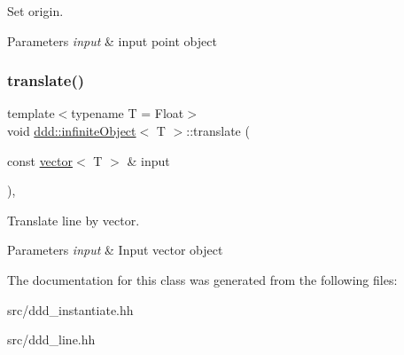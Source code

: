 Set origin. 


\begin{DoxyParams}{Parameters}
{\em input} & input point object \\
\hline
\end{DoxyParams}
\mbox{\label{classddd_1_1infinite_object_a72649daa44060efdbef986ab9d90f3f6}} 
\subsubsection{\texorpdfstring{translate()}{translate()}}
{\footnotesize\ttfamily template$<$typename T = Float$>$ \\
void \hyperlink{classddd_1_1infinite_object}{ddd\+::infinite\+Object}$<$ T $>$\+::translate (\begin{DoxyParamCaption}\item[{const \hyperlink{classddd_1_1vector}{vector}$<$ T $>$ \&}]{input }\end{DoxyParamCaption})\hspace{0.3cm}{\ttfamily [inline]}, {\ttfamily [inherited]}}



Translate line by vector. 


\begin{DoxyParams}{Parameters}
{\em input} & Input vector object \\
\hline
\end{DoxyParams}


The documentation for this class was generated from the following files\+:\begin{DoxyCompactItemize}
\item 
src/ddd\+\_\+instantiate.\+hh\item 
src/ddd\+\_\+line.\+hh\end{DoxyCompactItemize}
